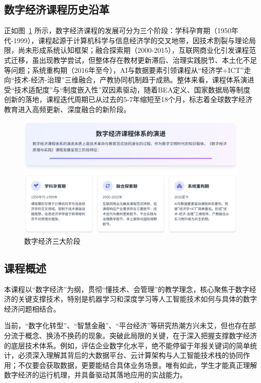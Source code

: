 \documentclass[lang=cn,12pt,a4paper]{elegantpaper}
\begin{document}
\subsection{数字经济课程历史沿革} \label{sec:history}
正如图~\ref{fig:dig_eco} 所示，数字经济课程的发展可分为三个阶段：学科孕育期（1950年代-1999），课程起源于计算机科学与信息经济学的交叉地带，因技术割裂与理论局限，尚未形成系统认知框架；融合探索期（2000-2015），互联网商业化引发课程范式迁移，虽出现教学尝试，但整体存在教材更新滞后、治理实践脱节、本土化不足等问题；系统重构期（2016年至今），AI与数据要素引领课程从“经济学+ICT”走向“技术-经济-治理”三维融合，产教协同机制趋于成熟。整体来看，课程体系演进受“技术适配度”与“制度嵌入性”双因素驱动，随着BEA定义、国家数据局等制度创新的落地，课程迭代周期已从过去的5-7年缩短至18个月，标志着全球数字经济教育进入高频更新、深度融合的新阶段。
\begin{figure}[H]
    \centering
    \includegraphics[width=1\linewidth]{his_dig.png}
    \caption{数字经济三大阶段}
    \label{fig:dig_eco}
\end{figure}

\subsection{课程概述} \label{sec:overview}
本课程以“数字经济”为纲，贯彻“懂技术、会管理”的教学理念，核心聚焦于数字经济的关键支撑技术，特别是机器学习和深度学习等人工智能技术如何与具体的数字经济问题相结合。

当前，“数字化转型”、“智慧金融”、“平台经济”等研究热潮方兴未艾，但也存在部分流于概念、换汤不换药的现象。突破此局限的关键，在于深入把握支撑数字经济的底层技术体系。例如，评估企业数字化水平，绝不能停留于年报关键词的简单统计，必须深入理解其背后的大数据平台、云计算架构与人工智能技术栈的协同作用；不仅要会获取数据，更要能结合具体业务场景。唯有如此，学生才能真正理解数字经济的运行机理，并具备驱动其落地应用的实战能力。
\end{document}
